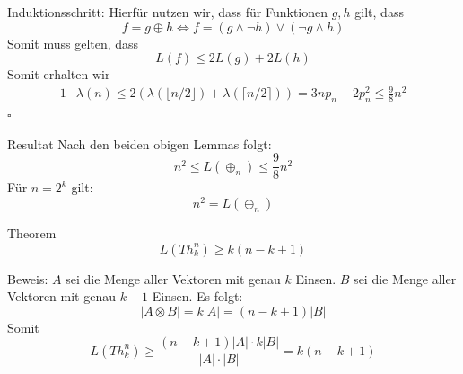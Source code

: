 \begin{frame}[t]
    Induktionsschritt:
    \newline
    \newline
    Hierfür nutzen wir, dass für Funktionen $g,h$ gilt, dass
    \[
        f = g \oplus h \Leftrightarrow f = (g \land \lnot h) \lor (\lnot g \land h)
    \]
    Somit muss gelten, dass
    \[
        L(f) \leq 2L(g) + 2L(h)
    \]
    Somit erhalten wir
    \begin{alignat*}{1}
        &\lambda(n) \leq 2(\lambda(\lfloor n/2 \rfloor) + \lambda(\lceil n/2 \rceil)) = 3np_n - 2p_n^2 \leq \frac{9}{8} n^2
    \end{alignat*}
    \hfill$\square$
\end{frame}

\begin{frame}
    \begin{block}{Resultat}
        Nach den beiden obigen Lemmas folgt:
        \[
            n^2 \leq L(\oplus_n) \leq \frac{9}{8}n^2
        \]
        Für $n = 2^k$ gilt:
        \[
            n^2 = L(\oplus_n)
        \]
    \end{block}
\end{frame}

\begin{frame}
    \begin{block}{Theorem}
        \[
            L(Th^n_k) \geq k(n-k+1)
        \]
    \end{block}
\end{frame}

\begin{frame}[t]
    Beweis:
    \newline
    \newline
    $A$ sei die Menge aller Vektoren mit genau $k$ Einsen.
    \newline
    \newline
    \pause
    $B$ sei die Menge aller Vektoren mit genau $k-1$ Einsen.
    \newline
    \newline
    \pause
    Es folgt:
    \[
        |A\otimes B| = k|A| = (n-k+1)|B|
    \]
    \pause
    Somit
    \[
        L(Th_k^n) \geq \frac{(n-k+1)|A|\cdot k|B|}{|A|\cdot|B|} = k(n-k+1)
    \]
\end{frame}

